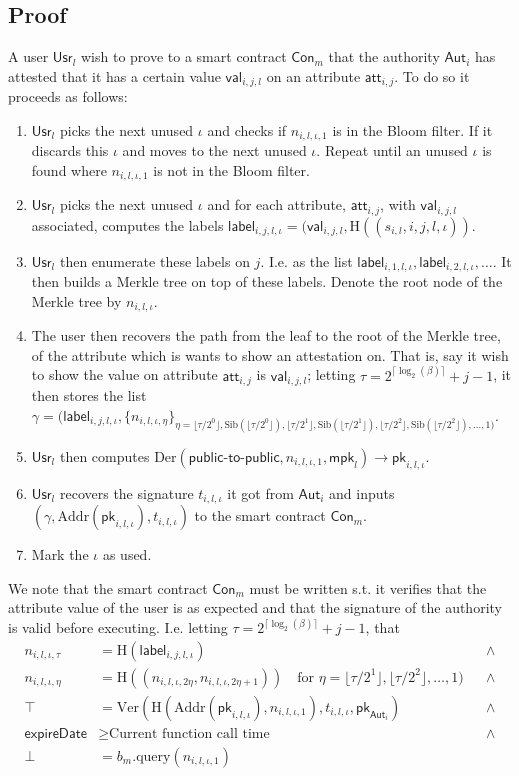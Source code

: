 \documentclass[11pt]{article} %
\newcommand{\Hash}{\ensuremath{\mathrm{H}}}
\newcommand{\aut}{\ensuremath{\mathsf{Aut}_i}}
\newcommand{\att}{\ensuremath{\mathsf{att}_{i,j}}}
\newcommand{\val}{\ensuremath{\mathsf{val}_{i,j,l}}}
\newcommand{\usr}{\ensuremath{\mathsf{Usr}_l}}
\newcommand{\con}{\ensuremath{\mathsf{Con}_m}}
\newcommand{\lab}{\ensuremath{\mathsf{label}}}
\newcommand{\mpk}{\ensuremath{\mathsf{mpk}}}
\newcommand{\pk}{\ensuremath{\mathsf{pk}}}
\newcommand{\expireDate}{\ensuremath{\mathsf{expireDate}}}
\newcommand{\Der}{\ensuremath{\mathrm{Der}}}
\newcommand{\Ver}{\ensuremath{\mathrm{Ver}}}
\newcommand{\Addr}{\ensuremath{\mathrm{Addr}}}
\newcommand{\Sib}{\ensuremath{\mathrm{Sib}}}
\newcommand{\query}{\ensuremath{\mathrm{query}}}
\begin{document}
\subsection{Proof}
A user $\usr$ wish to prove to a smart contract $\con$ that the authority $\aut$ has attested that it has a certain value $\val$ on an attribute $\att$. To do so it proceeds as follows:
\begin{enumerate}
	\item $\usr$ picks the next unused $\iota$ and checks if $n_{i,l, \iota, 1}$ is in the Bloom filter. If it discards this $\iota$ and moves to the next unused $\iota$. Repeat until an unused $\iota$ is found where $n_{i,l, \iota, 1}$ is not in the Bloom filter.
	\item $\usr$ picks the next unused $\iota$ and for each attribute, $\att$, with $\val$ associated, computes the labels $\lab_{i,j,l,\iota}=(\val, \Hash((s_{i,l}, i, j, l, \iota))$.
	\item $\usr$ then enumerate these labels on $j$. I.e. as the list $\lab_{i,1,l,\iota}, \lab_{i,2,l,\iota}, \dots$. It then builds a Merkle tree on top of these labels. Denote the root node of the Merkle tree by $n_{i,l,\iota}$.
	\item The user then recovers the path from the leaf to the root of the Merkle tree, of the attribute which is wants to show an attestation on. That is, say it wish to show the value on attribute $\att$ is $\val$; letting $\tau=2^{\lceil\log_2(\beta)\rceil}+j-1$, it then stores the list $\gamma=(\lab_{i,j,l,\iota}, \{n_{i,l, \iota, \eta}\}_{\eta =\lfloor\tau/2^0\rfloor, \Sib(\lfloor\tau/2^0\rfloor), \lfloor\tau/2^1\rfloor, \Sib(\lfloor\tau/2^1\rfloor), \lfloor\tau/2^2\rfloor, \Sib(\lfloor\tau/2^2\rfloor),\dots, 1)}$.
	\item $\usr$ then computes $\Der(\mathsf{public}\mbox{-}\mathsf{to}\mbox{-}\mathsf{public}, n_{i,l,\iota, 1}, \mpk_l)\to \pk_{i,l,\iota}$.
	\item $\usr$ recovers the signature $t_{i,l,\iota}$ it got from $\aut$ and inputs $(\gamma, \Addr(\pk_{i,l,\iota}), t_{i,l,\iota})$ to the smart contract $\con$.
	\item Mark the $\iota$ as used.
\end{enumerate}

We note that the smart contract $\con$ must be written s.t. it verifies that the attribute value of the user is as expected and that the signature of the authority is valid before executing. I.e. letting $\tau=2^{\lceil\log_2(\beta)\rceil}+j-1$, that 
\begin{align*}
n_{i, l, \iota, \tau } &= \Hash( \lab_{i,j,l,\iota} ) &&\wedge\\
n_{i, l, \iota, \eta} &= \Hash( (n_{i,l,\iota,  2 \eta}, n_{i,l,\iota, 2 \eta+1}) ) \quad \text{for } \eta= \lfloor\tau/2^1\rfloor, \lfloor\tau/2^2\rfloor, \dots, 1) &&\wedge\\
\top&=\Ver(\Hash(\Addr(\pk_{i,l,\iota}), n_{i,l,\iota, 1}), t_{i,l, \iota}, \pk_{\aut}) &&\wedge\\
\expireDate &\geq \text{Current function call time} &&\wedge\\
\bot &= b_m.\query(n_{i, l, \iota, 1})
\end{align*}
\end{document}
